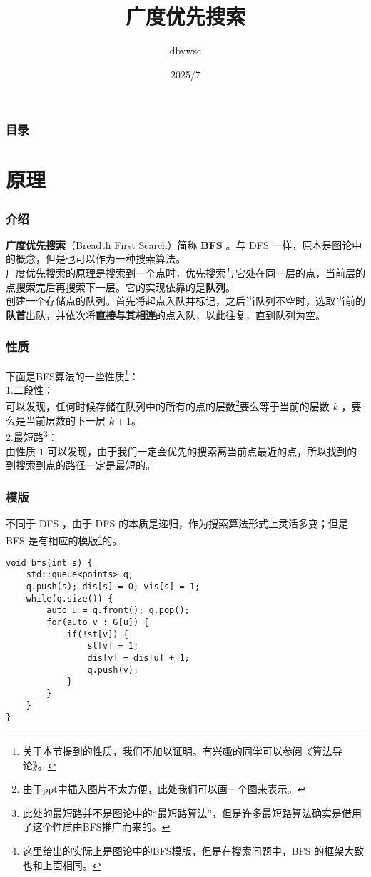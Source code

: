 \documentclass{beamer}
\title{广度优先搜索}
\author{dbywsc}
\date{2025/7}
\newcommand{\fdf}[1]{\alert{\textbf{#1}}}
\begin{document}
\frame{\titlepage}
\begin{frame}
	\frametitle{目录}
	\tableofcontents
\end{frame}
\section{原理}
\begin{frame}
\frametitle{介绍}
\fdf{广度优先搜索}（Breadth First Search）简称 \fdf{BFS} 。与 DFS 一样，原本是图论中的概念，但是也可以作为一种搜索算法。\\
广度优先搜索的原理是搜索到一个点时，优先搜索与它处在同一层的点，当前层的点搜索完后再搜索下一层。它的实现依靠的是\fdf{队列}。\\ 
创建一个存储点的队列。首先将起点入队并标记，之后当队列不空时，选取当前的\fdf{队首}出队，并依次将\fdf{直接与其相连}的点入队，以此往复，直到队列为空。
\end{frame}
\begin{frame}
\frametitle{性质} 
下面是BFS算法的一些性质\footnote{关于本节提到的性质，我们不加以证明。有兴趣的同学可以参阅《算法导论》。}： \\
1.二段性：\\
可以发现，任何时候存储在队列中的所有的点的层数\footnote{由于ppt中插入图片不太方便，此处我们可以画一个图来表示。}要么等于当前的层数 $k$ ，要么是当前层数的下一层 $k + 1$。\\
2.最短路\footnote{此处的最短路并不是图论中的“最短路算法”，但是许多最短路算法确实是借用了这个性质由BFS推广而来的。}：\\
由性质 $1$ 可以发现，由于我们一定会优先的搜索离当前点最近的点，所以找到的到搜索到点的路径一定是最短的。
\end{frame}
\begin{frame}[fragile]
\frametitle{模版}
不同于 DFS ，由于 DFS 的本质是递归，作为搜索算法形式上灵活多变；但是 BFS 是有相应的模版\footnote{这里给出的实际上是图论中的BFS模版，但是在搜索问题中，BFS 的框架大致也和上面相同。}的。
\begin{onlyenv}
\begin{verbatim}
void bfs(int s) {
    std::queue<points> q;
    q.push(s); dis[s] = 0; vis[s] = 1;
    while(q.size()) {
        auto u = q.front(); q.pop();
        for(auto v : G[u]) {
            if(!st[v]) {
                st[v] = 1;
                dis[v] = dis[u] + 1;
                q.push(v);
            }
        }
    }
}
\end{verbatim}
\end{onlyenv}
\end{frame}
\end{document}
